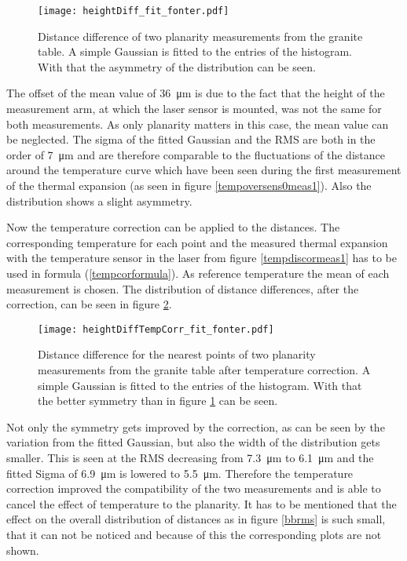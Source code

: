 \documentclass[
a4paper,                                %
twoside,                                %
BCOR1.4cm,                      %
10pt,                           %
headings=normal,                %
headsepline,                    %
clearplainpage, %
final,                                  %
div=14,
parskip=full,
openright,
bibliography=toc
]{scrreprt}
\begin{document}
\begin{figure}[H]
	\centering
	\texttt{[image: heightDiff\_fit\_fonter.pdf]}
	\caption{Distance difference of two planarity measurements from the granite table. A simple Gaussian is fitted to the entries of the histogram. With that the asymmetry of the distribution can be seen.}
	\label{bbrmdisdif}
\end{figure}  

The offset of the mean value of \SI{36}{\micro\m} is due to the fact that the height of the measurement arm, at which the laser sensor is mounted, was not the same for both measurements. As only planarity matters in this case, the mean value can be neglected. The sigma of the fitted Gaussian and the RMS are both in the order of \SI{7}{\micro\m} and are therefore comparable to the fluctuations of the distance around the temperature curve which have been seen during the first measurement of the thermal expansion (as seen in figure \ref{tempoversens0meas1}). Also the distribution shows a slight asymmetry. 

Now the temperature correction can be applied to the distances. The corresponding temperature for each point and the measured thermal expansion with the temperature sensor in the laser from figure \ref{tempdiscormeas1} has to be used in formula (\ref{tempcorformula}). As reference temperature the mean of each measurement is chosen. The distribution of distance differences, after the correction, can be seen in figure \ref{bbrmdistempcordif}.

\begin{figure}[H]
	\centering
	\texttt{[image: heightDiffTempCorr\_fit\_fonter.pdf]}
	\caption{Distance difference for the nearest points of two planarity measurements from the granite table after temperature correction. A simple Gaussian is fitted to the entries of the histogram. With that the better symmetry than in figure \ref{bbrmdisdif} can be seen.}
	\label{bbrmdistempcordif}
\end{figure}

Not only the symmetry gets improved by the correction, as can be seen by the variation from the fitted Gaussian, but also the width of the distribution gets smaller. This is seen at the RMS decreasing from \SI{7.3}{\micro\m} to \SI{6.1}{\micro\m} and the fitted Sigma of \SI{6.9}{\micro\m} is lowered to \SI{5.5}{\micro\m}. Therefore the temperature correction improved the compatibility of the two measurements and is able to cancel the effect of temperature to the planarity. It has to be mentioned that the effect on the overall distribution of distances as in figure \ref{bbrms} is such small, that it can not be noticed and because of this the corresponding plots are not shown. 
\end{document}
